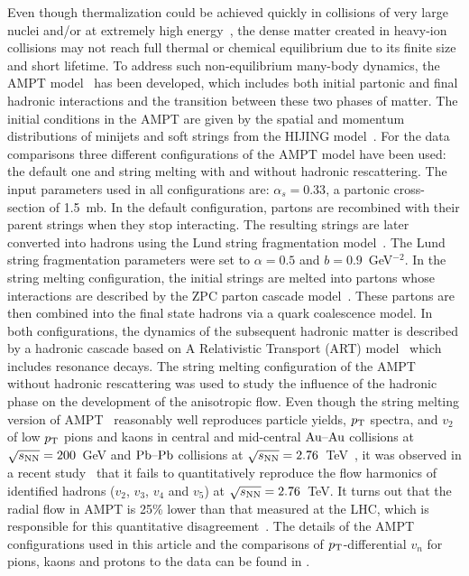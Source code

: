 Even though thermalization could be achieved quickly in collisions of very large nuclei and/or at extremely high energy~\cite{Kurkela:2015qoa}, the dense matter created in heavy-ion collisions may not reach full thermal or chemical equilibrium due to its finite size and short lifetime. To address such non-equilibrium many-body dynamics, the AMPT model~\cite{Zhang:1999bd,Lin:2000cx,Lin:2004en} has been developed, which includes both initial partonic and final hadronic interactions and the transition between these two phases of matter.
The initial conditions in the AMPT are given by the spatial and momentum distributions of minijets and soft strings from the HIJING model~\cite{Wang:1991hta,Gyulassy:1994ew}.
For the data comparisons three different configurations of the AMPT model have been used: the default one and string melting with and without hadronic rescattering. The input parameters used in all configurations are: $\alpha_s = 0.33$, a partonic cross-section of 1.5~mb.
In the default configuration, partons are recombined with their parent strings when they stop interacting. The resulting strings are later converted into hadrons using the Lund string fragmentation model~\cite{Andersson:1986gw,NilssonAlmqvist:1986rx}.
The Lund string fragmentation parameters were set to $\alpha = 0.5$ and $b = 0.9$~GeV$^{-2}$.
In the string melting configuration, the initial strings are melted into partons whose interactions are described by the ZPC parton cascade model~\cite{Zhang:1997ej}. These partons are then combined into the final state hadrons via a quark coalescence model. 
In both configurations, the dynamics of the subsequent hadronic matter is described by a hadronic cascade based on A Relativistic Transport (ART) model~\cite{Li:2001xh} which includes resonance decays.
The string melting configuration of the AMPT without hadronic rescattering was used to study the influence of the hadronic phase on the development of the anisotropic flow.
Even though the string melting version of AMPT~\cite{Lin:2001zk,Lin:2004en} reasonably well reproduces particle yields, $p_{\rm T}$ spectra, and $v_2$ of low $p_{\rm T}$ pions and kaons in central and mid-central $\textnormal{Au--Au}$ collisions at $\sqrt{s_{\textnormal{NN}}}=200$~GeV and $\textnormal{Pb--Pb}$ collisions at $\sqrt{s_{\textnormal{NN}}}=2.76$~TeV~\cite{Lin:2014tya}, it was observed in a recent study~\cite{Adam:2016nfo} that it fails to quantitatively reproduce the flow harmonics of identified hadrons ($v_2$, $v_3$, $v_4$ and $v_5$) at $\sqrt{s_{\textnormal{NN}}}=2.76$~TeV. It turns out that the radial flow in AMPT is 25\% lower than that measured at the LHC, which is responsible for this quantitative disagreement~\cite{Adam:2016nfo}. The details of the AMPT configurations used in this article and the comparisons of $p_{\rm T}$-differential $v_{n}$ for pions, kaons and protons to the data can be found in \cite{Adam:2016nfo}.

